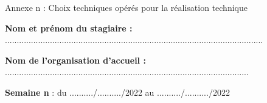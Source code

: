 \documentclass[a4paper,11pt]{article}
\makeatletter
\newcommand{\mktitle}{\@maketitle}
\makeatother
\begin{document}
\begin{center}\LARGE Annexe n : Choix techniques opérés pour la réalisation technique\end{center}
\newpage

\mktitle\vspace{-.2cm}

\noindent\textbf{Nom et prénom du stagiaire :} .............................................................................................................\vspace{.4cm}

\noindent\textbf{Nom de l'organisation d'accueil :} .......................................................................................................\vspace{.4cm}

\noindent\textbf{Semaine n} : du ........../........../2022 au ........../........../2022\vspace{-.2cm}
\end{document}
